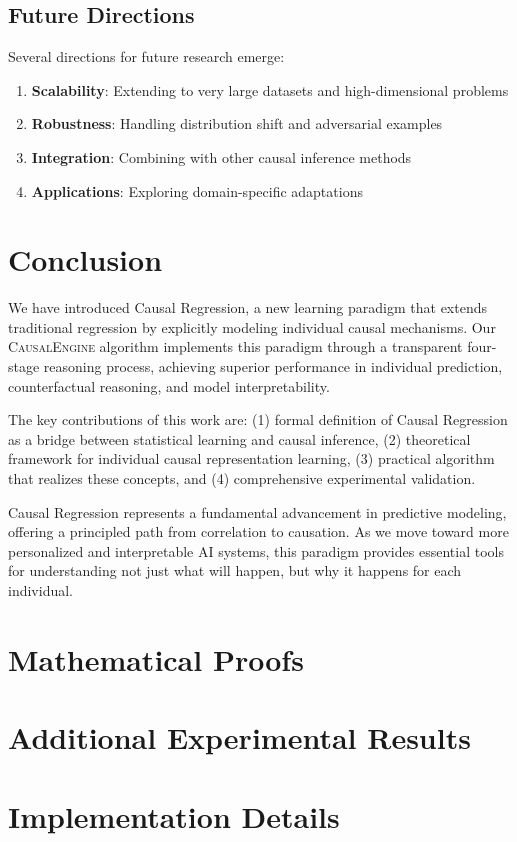 \documentclass[conference]{IEEEtran}
\newcommand{\causalengine}{\textsc{CausalEngine}}
\begin{document}
\subsection{Future Directions}

Several directions for future research emerge:

\begin{enumerate}
\item \textbf{Scalability}: Extending to very large datasets and high-dimensional problems
\item \textbf{Robustness}: Handling distribution shift and adversarial examples
\item \textbf{Integration}: Combining with other causal inference methods
\item \textbf{Applications}: Exploring domain-specific adaptations
\end{enumerate}

\section{Conclusion}
\label{sec:conclusion}

We have introduced Causal Regression, a new learning paradigm that extends traditional regression by explicitly modeling individual causal mechanisms. Our \causalengine{} algorithm implements this paradigm through a transparent four-stage reasoning process, achieving superior performance in individual prediction, counterfactual reasoning, and model interpretability.

The key contributions of this work are: (1) formal definition of Causal Regression as a bridge between statistical learning and causal inference, (2) theoretical framework for individual causal representation learning, (3) practical algorithm that realizes these concepts, and (4) comprehensive experimental validation.

Causal Regression represents a fundamental advancement in predictive modeling, offering a principled path from correlation to causation. As we move toward more personalized and interpretable AI systems, this paradigm provides essential tools for understanding not just what will happen, but why it happens for each individual.




\appendix

\section{Mathematical Proofs}
\label{app:proofs}


\section{Additional Experimental Results}
\label{app:results}


\section{Implementation Details}
\label{app:implementation}

\end{document}
